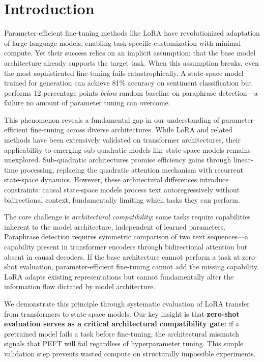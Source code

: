 \section{Introduction}

Parameter-efficient fine-tuning methods like LoRA \cite{hu2021lora} have revolutionized adaptation of large language models, enabling task-specific customization with minimal compute. Yet their success relies on an implicit assumption: that the base model architecture already supports the target task. When this assumption breaks, even the most sophisticated fine-tuning fails catastrophically. A state-space model trained for generation can achieve 81\% accuracy on sentiment classification but performs 12 percentage points \textit{below} random baseline on paraphrase detection---a failure no amount of parameter tuning can overcome.

This phenomenon reveals a fundamental gap in our understanding of parameter-efficient fine-tuning across diverse architectures. While LoRA and related methods \cite{li2021prefix,lester2021power} have been extensively validated on transformer architectures, their applicability to emerging sub-quadratic models like state-space models \cite{gu2023mamba} remains unexplored. Sub-quadratic architectures promise efficiency gains through linear-time processing, replacing the quadratic attention mechanism with recurrent state-space dynamics. However, these architectural differences introduce constraints: causal state-space models process text autoregressively without bidirectional context, fundamentally limiting which tasks they can perform.

The core challenge is \textit{architectural compatibility}: some tasks require capabilities inherent to the model architecture, independent of learned parameters. Paraphrase detection requires symmetric comparison of two text sequences---a capability present in transformer encoders through bidirectional attention but absent in causal decoders. If the base architecture cannot perform a task at zero-shot evaluation, parameter-efficient fine-tuning cannot add the missing capability. LoRA adapts existing representations but cannot fundamentally alter the information flow dictated by model architecture.

We demonstrate this principle through systematic evaluation of LoRA transfer from transformers to state-space models. Our key insight is that \textbf{zero-shot evaluation serves as a critical architectural compatibility gate}: if a pretrained model fails a task before fine-tuning, the architectural mismatch signals that PEFT will fail regardless of hyperparameter tuning. This simple validation step prevents wasted compute on structurally impossible experiments.

